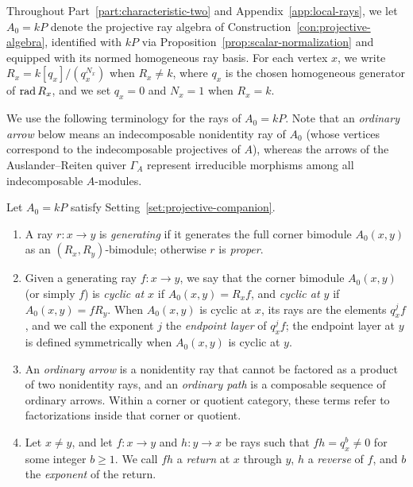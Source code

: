 \begin{setting}
\label{set:projective-companion}
Throughout Part~\ref{part:characteristic-two} and Appendix~\ref{app:local-rays}, we let $A_0=kP$ denote the projective ray algebra of Construction~\ref{con:projective-algebra}, identified with $kP$ via Proposition~\ref{prop:scalar-normalization} and equipped with its normed homogeneous ray basis. For each vertex $x$, we write $R_x=k[q_x]/(q_x^{N_x})$ when $R_x\ne k$, where $q_x$ is the chosen homogeneous generator of $\operatorname{rad} R_x$, and we set $q_x=0$ and $N_x=1$ when $R_x=k$.
\end{setting}

We use the following terminology for the rays of $A_0=kP$. Note that an \emph{ordinary arrow} below means an indecomposable nonidentity ray of $A_0$ (whose vertices correspond to the indecomposable projectives of $A$), whereas the arrows of the Auslander--Reiten quiver $\Gamma_A$ represent irreducible morphisms among all indecomposable $A$-modules.

\begin{definition}
\label{def:generating-rays}
Let $A_0=kP$ satisfy Setting~\ref{set:projective-companion}.
\begin{enumerate}[label={\upshape(\arabic*)}]
\item A ray $r\colon x\to y$ is \emph{generating} if it generates the full corner bimodule $A_0(x,y)$ as an $(R_x,R_y)$-bimodule; otherwise $r$ is \emph{proper}.
\item Given a generating ray $f\colon x\to y$, we say that the corner bimodule $A_0(x,y)$ (or simply $f$) is \emph{cyclic at $x$} if $A_0(x,y)=R_xf$, and \emph{cyclic at $y$} if $A_0(x,y)=fR_y$. When $A_0(x,y)$ is cyclic at $x$, its rays are the elements $q_x^jf$, and we call the exponent $j$ the \emph{endpoint layer} of $q_x^jf$; the endpoint layer at $y$ is defined symmetrically when $A_0(x,y)$ is cyclic at $y$.
\item An \emph{ordinary arrow} is a nonidentity ray that cannot be factored as a product of two nonidentity rays, and an \emph{ordinary path} is a composable sequence of ordinary arrows. Within a corner or quotient category, these terms refer to factorizations inside that corner or quotient.
\item Let $x\ne y$, and let $f\colon x\to y$ and $h\colon y\to x$ be rays such that $fh=q_x^b\ne0$ for some integer $b\geq1$. We call $fh$ a \emph{return} at $x$ through $y$, $h$ a \emph{reverse} of $f$, and $b$ the \emph{exponent} of the return.
\end{enumerate}
\end{definition}

